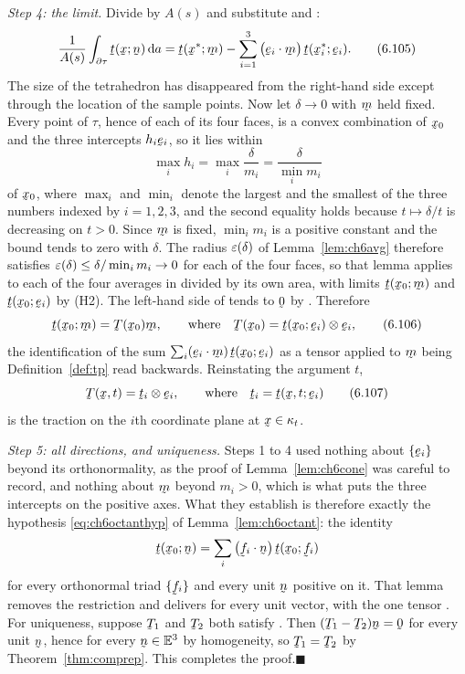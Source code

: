 \emph{Step 4: the limit.} Divide  by $A(s)$ and substitute
 and :
\begin{equation}
   \frac{1}{A(s)}\int_{\partial\tau}\bt(\bx;\bn)\,\dl a
   =\bt(\bx^{*};\bm)
   -\sum_{i=1}^{3}\big(\ip{\be_{i}}\bm\big)\,\bt(\bx^{*}_{i};\be_{i}).
   \tag{6.105}\label{eq:6.105}
\end{equation}
The size of the tetrahedron has disappeared from the right-hand side
except through the location of the sample points. Now let $\delta\to0$
with $\bm$ held fixed. Every point of $\tau$, hence of each of its four
faces, is a convex combination of $\bx_{0}$ and the three intercepts
$h_{i}\be_{i}$, so it lies within
\[
   \max_{i}h_{i}
   =\max_{i}\frac{\delta}{m_{i}}
   =\frac{\delta}{\min_{i}m_{i}}
\]
of $\bx_{0}$, where $\max_{i}$ and $\min_{i}$ denote the largest and the
smallest of the three numbers indexed by $i=1,2,3$, and the second
equality holds because $t\mapsto\delta/t$ is decreasing on $t>0$. Since
$\bm$ is fixed, $\min_{i}m_{i}$ is a positive constant and the bound
tends to zero with $\delta$. The radius $\varepsilon(\delta)$ of
Lemma~\ref{lem:ch6avg} therefore satisfies
$\varepsilon(\delta)\le\delta/\min_{i}m_{i}\to0$ for each of the four faces,
so that lemma applies to each of the four averages in 
divided by its own area, with limits $\bt(\bx_{0};\bm)$ and
$\bt(\bx_{0};\be_{i})$ by \textup{(H2)}. The left-hand side of
 tends to $\bze$ by . Therefore
\begin{equation}
   \bt(\bx_{0};\bm)=\bT(\bx_{0})\bm ,
   \qquad\text{where}\quad
   \bT(\bx_{0})=\bt(\bx_{0};\be_{i})\otimes\be_{i},
   \tag{6.106}\label{eq:6.106}
\end{equation}
the identification of the sum
$\sum_{i}(\ip{\be_{i}}\bm)\,\bt(\bx_{0};\be_{i})$ as a tensor applied to
$\bm$ being Definition~\ref{def:tp} read backwards. Reinstating the
argument $t$,
\begin{equation}
   \bT(\bx,t)=\bt_{i}\otimes\be_{i},
   \qquad\text{where}\quad \bt_{i}=\bt(\bx,t;\be_{i})
   \tag{6.107}\label{eq:6.107}
\end{equation}
is the traction on the $i$th coordinate plane at $\bx\in\kappa_{t}$.

\emph{Step 5: all directions, and uniqueness.} Steps 1 to 4 used
nothing about $\{\be_{i}\}$ beyond its orthonormality, as the proof of
Lemma~\ref{lem:ch6cone} was careful to record, and nothing about $\bm$
beyond $m_{i}>0$, which is what puts the three intercepts on the
positive axes. What they establish is therefore exactly the hypothesis
\eqref{eq:ch6octanthyp} of Lemma~\ref{lem:ch6octant}: the identity
\[
   \bt(\bx_{0};\bn)=\sum_{i}\big(\ip{\bff_{i}}\bn\big)\,
   \bt(\bx_{0};\bff_{i})
\]
for every orthonormal triad $\{\bff_{i}\}$ and every unit $\bn$ positive
on it. That lemma removes the restriction and delivers  for
every unit vector, with the one tensor . For uniqueness, suppose
$\bT_{1}$ and $\bT_{2}$ both satisfy . Then
$(\bT_{1}-\bT_{2})\bn=\bze$ for every unit $\bn$, hence for every
$\bn\in\Vt$ by homogeneity, so $\bT_{1}=\bT_{2}$ by
Theorem~\ref{thm:comprep}. This completes the proof.\hfill$\blacksquare$

